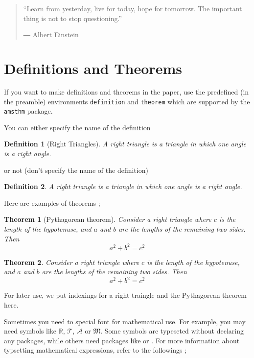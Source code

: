 \documentclass[11pt]{report}
\newtheorem{theorem}{Theorem} %
\newtheorem{definition}{Definition} %
\begin{document}
\begin{quotation}
“Learn from yesterday, live for today, hope for tomorrow. The important thing is not to stop questioning.” \par
― Albert Einstein 
\end{quotation}

\section{Definitions and Theorems}

If you want to make definitions and theorems in the paper, use the predefined (in the preamble) environments \texttt{definition} and \texttt{theorem} which are supported by the \texttt{amsthm} package.

You can either specify the name of the definition
\begin{definition}[Right Triangles]
A right triangle is a triangle in which one angle is a right angle.
\end{definition}
or not (don't specify the name of the definition)
\begin{definition}
A right triangle is a triangle in which one angle is a right angle.
\end{definition}

Here are examples of theorems ;
\begin{theorem}[Pythagorean theorem]
Consider a right triangle where \(c\) is the length of the hypotenuse, and \(a\) and \(b\) are the lengths of the remaining two sides.
Then
\begin{equation}
a^2+b^2=c^2
\end{equation}
\end{theorem}

\begin{theorem}
Consider a right triangle where \(c\) is the length of the hypotenuse, and \(a\) and \(b\) are the lengths of the remaining two sides.
Then
\begin{equation}
a^2+b^2=c^2
\end{equation}
\end{theorem}
For later use, we put indexings for a right traingle and the Pythagorean theorem here.

Sometimes you need to special font for mathematical use.
For example, you may need symbols like \(\mathbb R\), \(\mathcal T\), \(\mathscr A\) or \(\mathfrak M\).
Some symbols are typeseted without declaring any packages, while others need packages like  or .
For more information about typsetting mathematical expressions, refer to the followings ;
\end{document}
